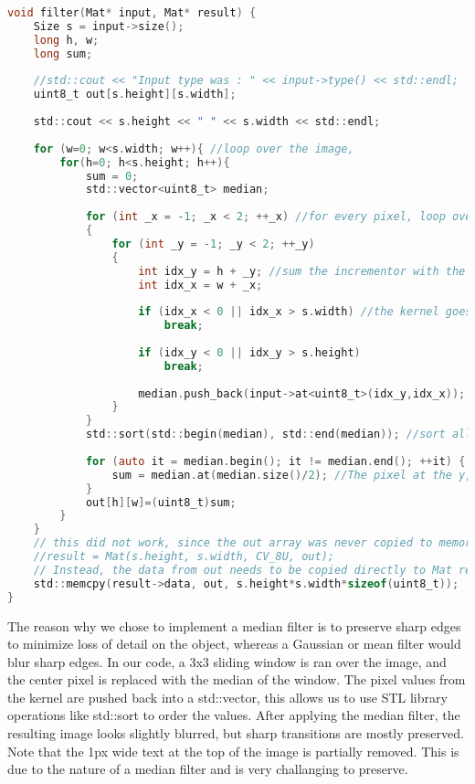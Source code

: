 \begin{lstlisting}[language=C, caption=Noise correction filter, label=lst:noise_filter]
void filter(Mat* input, Mat* result) {
    Size s = input->size();
    long h, w;
    long sum;
    
    //std::cout << "Input type was : " << input->type() << std::endl;
    uint8_t out[s.height][s.width];
    
    std::cout << s.height << " " << s.width << std::endl;
    
    for (w=0; w<s.width; w++){ //loop over the image, 
        for(h=0; h<s.height; h++){
            sum = 0;
            std::vector<uint8_t> median;
            
            for (int _x = -1; _x < 2; ++_x) //for every pixel, loop over every pixel in a 3x3 kernel
            {
                for (int _y = -1; _y < 2; ++_y)
                {
                    int idx_y = h + _y; //sum the incrementor with the kernel's, so we can identify borders
                    int idx_x = w + _x;
                    
                    if (idx_x < 0 || idx_x > s.width) //the kernel goes outside of the image, therefore break and ignore that pixel.
                        break;
                        
                    if (idx_y < 0 || idx_y > s.height)
                        break;
                    
                    median.push_back(input->at<uint8_t>(idx_y,idx_x)); // Add all the pixels from the kernel into a vector
                }
            }
            std::sort(std::begin(median), std::end(median)); //sort all pixel values from high to low
                    
            for (auto it = median.begin(); it != median.end(); ++it) {
                sum = median.at(median.size()/2); //The pixel at the y,x coordinate is now the median from our 3x3 sliding window
            }
            out[h][w]=(uint8_t)sum;
        }
    }
    // this did not work, since the out array was never copied to memory, causing image data pointing to nowhere!
    //result = Mat(s.height, s.width, CV_8U, out); 
    // Instead, the data from out needs to be copied directly to Mat result with the correct size
    std::memcpy(result->data, out, s.height*s.width*sizeof(uint8_t));
}

\end{lstlisting}

The reason why we chose to implement a median filter is to preserve sharp edges to minimize loss of detail on the object, whereas a Gaussian or mean filter would blur sharp edges. In our code, a 3x3 sliding window is ran over the image, and the center pixel is replaced with the median of the window. The pixel values from the kernel are pushed back into a std::vector, this allows us to use STL library operations like std::sort to order the values.
After applying the median filter, the resulting image looks slightly blurred, but sharp transitions are mostly preserved. Note that the 1px wide text at the top of the image is partially removed. This is due to the nature of a median filter and is very challanging to preserve.

